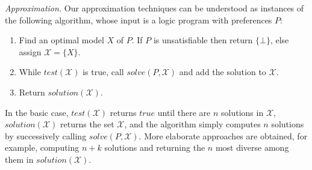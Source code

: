 \emph{Approximation.}
%
Our approximation techniques can be understood as instances of the following algorithm,
whose input is a logic program with preferences $P$:
%
\begin{enumerate}%
\item
Find an optimal model $X$ of  $P$. 
If $P$ is unsatisfiable then return $\{\bot\}$, else assign $\mathcal{X}=\{X\}$.
\item
While $\mathit{test}(\mathcal{X})$ is true, call $\mathit{solve}(P,\mathcal{X})$ and add the solution to $\mathcal{X}$.
\item
Return $\mathit{solution}(\mathcal{X})$.
\end{enumerate}
%
In the basic case,
$\mathit{test}(\mathcal{X})$ returns $\mathit{true}$ until there are $n$ solutions in $\mathcal{X}$, 
$\mathit{solution}(\mathcal{X})$ returns the set $\mathcal{X}$,
and the algorithm simply computes $n$ solutions by successively calling $\mathit{solve}(P,\mathcal{X})$.
More elaborate approaches are obtained, for example, computing $n+k$ solutions 
and returning the $n$ most diverse among them in $\mathit{solution(\mathcal{X})}$.

